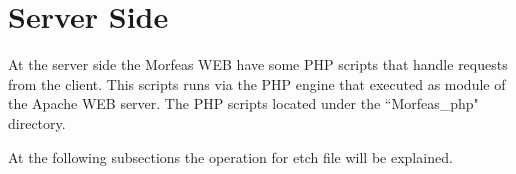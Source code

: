 \section{Server Side}
At the server side the Morfeas WEB have some PHP scripts that handle requests from the client. This scripts runs via the PHP engine that executed as module of the Apache WEB server.
The PHP scripts located under the ``Morfeas\_php" directory. 

At the following subsections the operation for etch file will be explained. 

\subsection{}